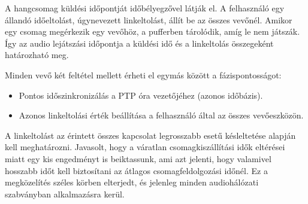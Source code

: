 A hangcsomag küldési időpontját időbélyegzővel látják el. A felhasználó egy állandó 
időeltolást, úgynevezett linkeltolást, állít be az összes vevőnél. Amikor egy csomag 
megérkezik egy vevőhöz, a pufferben tárolódik, amíg le nem játszák. 
Így az audio lejátszási időpontja a küldési idő és a linkeltolás összegeként határozható meg. \newline

Minden vevő két feltétel mellett érheti el egymás között a fázispontosságot:
\begin{itemize}
	\item Pontos időszinkronizálás a PTP óra vezetőjéhez (azonos időbázis).
	\item Azonos linkeltolási érték beállítása a felhasználó által az összes vevőeszközön.
\end{itemize}

A linkeltolást az érintett összes kapcsolat legrosszabb esetű késleltetése alapján kell meghatározni. 
Javasolt, hogy a váratlan csomagkiszállítási idők eltérései miatt egy kis engedményt is 
beiktassunk, ami azt jelenti, hogy valamivel hosszabb időt kell biztosítani az átlagos csomagfeldolgozási időnél. 
Ez a megközelítés széles körben elterjedt, és jelenleg minden audiohálózati szabványban alkalmazásra kerül.

